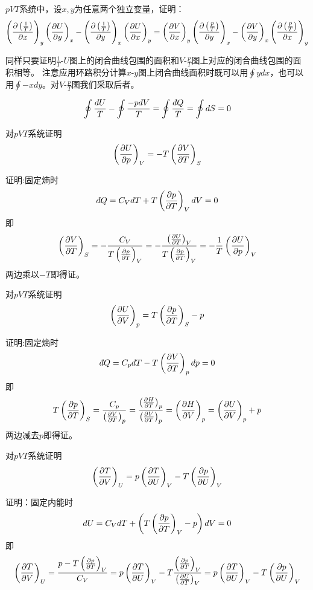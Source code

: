\documentclass[CJK]{beamer}
\begin{document}
\begin{frame}
  \bch
  $pVT$系统中，设$x, y$为任意两个独立变量，证明：
      {\scriptsize $$ \pfrac {\left(\frac{1}{T}\right)}xy \pfrac Uyx - \pfrac {\left(\frac{1}{T}\right)}yx \pfrac Uxy = \pfrac Vxy \pfrac {\left(\frac{p}{T}\right)}yx - \pfrac Vyx \pfrac {\left(\frac{p}{T}\right)}xy $$}  
  \ech
\end{frame}


\begin{frame}
  \bch
  同样只要证明$\frac{1}{T}$-$U$图上的闭合曲线包围的面积和$V$-$\frac{p}{T}$图上对应的闭合曲线包围的面积相等。
  注意应用环路积分计算$x$-$y$图上闭合曲线面积时既可以用$\oint ydx$，也可以用$\oint -x dy$。对$V$-$\frac{p}{T}$图我们采取后者。
  
  $$\oint \frac{dU}{T} - \oint \frac{-pdV}{T} = \oint \frac{\dbar Q}{T} = \oint dS = 0$$
  
  \ech
\end{frame}

\begin{frame}
  \bch
  对$pVT$系统证明
  $$\pfrac UpV = -T\pfrac VTS$$
  \ech
\end{frame}


\begin{frame}
  \bch
  证明:固定熵时
  $$ \dbar Q = C_V dT + T \pfrac pTV dV = 0 $$
  即
  $$ \pfrac VTS = -\frac{C_V}{T\pfrac pTV} = -\frac{\pfrac UTV}{T\pfrac pTV} = -\frac{1}{T} \pfrac UpV $$
  两边乘以$-T$即得证。
  \ech
\end{frame}


\begin{frame}
  \bch
  对$pVT$系统证明
  $$\pfrac UVp = T\pfrac pTS - p$$
  \ech
\end{frame}


\begin{frame}
  \bch
  证明:固定熵时
  $$ \dbar Q = C_p dT - T\pfrac VTp dp = 0 $$
  即
  $$ T\pfrac pTS = \frac{C_p}{\pfrac VTp} = \frac{\pfrac HTp}{\pfrac VTp} =  \pfrac HVp = \pfrac UVp + p $$
  两边减去$p$即得证。
  \ech
\end{frame}

\begin{frame}
  \bch
  对$pVT$系统证明
  $$\pfrac TVU = p\pfrac TUV - T\pfrac pUV $$
  \ech
\end{frame}


\begin{frame}
  \bch
  证明：固定内能时
  $$ dU = C_V dT + \left(T\pfrac pTV - p\right)dV = 0$$
  即
  {\scriptsize
  $$ \pfrac TVU = \frac{p-T\pfrac pTV }{C_V} = p\pfrac TUV - T\frac{\pfrac pTV}{\pfrac UTV}  = p\pfrac TUV - T\pfrac pUV $$}
  \ech
\end{frame}
\end{document}
